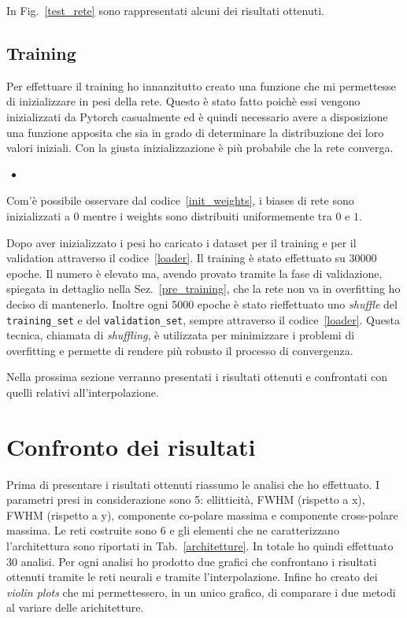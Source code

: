 \documentclass[12pt,a4paper,final]{book}
\newcommand{\insertcode}[2]{\begin{itemize}\item[]\end{itemize}} %
\begin{document}
In Fig.~\ref{test_rete} sono rappresentati alcuni dei risultati ottenuti.



\subsection{Training}\label{training}
Per effettuare il training ho innanzitutto creato una funzione che mi permettesse di inizializzare in pesi della rete. Questo è stato fatto poichè essi vengono inizializzati da Pytorch casualmente ed è quindi necessario avere a disposizione una funzione apposita che sia in grado di determinare la distribuzione dei loro valori iniziali. Con la giusta inizializzazione è più probabile che la rete converga.
\insertcode{../scripts/init_weights.py}{Inizializzazione di weights e biases}\label{init_weights}
Com'è possibile osservare dal codice~\ref{init_weights}, i biases di rete sono inizializzati a $0$ mentre i weights sono distribuiti uniformemente tra $0$ e $1$.


Dopo aver inizializzato i pesi ho caricato i dataset per il training e per il validation attraverso il codice~\ref{loader}.
Il training è stato effettuato su 30000 epoche. Il numero è elevato ma, avendo provato tramite la fase di validazione, spiegata in dettaglio nella Sez.~\ref{pre_training}, che la rete non va in overfitting ho deciso di mantenerlo. 
Inoltre ogni 5000 epoche è stato rieffettuato uno \textit{shuffle} del \texttt{training\_set} e del \texttt{validation\_set}, sempre attraverso il codice~\ref{loader}. Questa tecnica, chiamata di \textit{shuffling}, è utilizzata per minimizzare i problemi di overfitting e permette di rendere più robusto il processo di convergenza.


Nella prossima sezione verranno presentati i risultati ottenuti e confrontati con quelli relativi all'interpolazione.


\section{Confronto dei risultati}\label{risultati}
Prima di presentare i risultati ottenuti riassumo le analisi che ho effettuato. I parametri presi in considerazione sono 5: ellitticità, FWHM (rispetto a x), FWHM (rispetto a y), componente co-polare massima e componente cross-polare massima. Le reti costruite sono 6 e gli elementi che ne caratterizzano l'architettura sono riportati in Tab.~\ref{architetture}. In totale ho quindi effettuato 30 analisi.
Per ogni analisi ho prodotto due grafici che confrontano i risultati ottenuti tramite le  reti neurali e tramite l'interpolazione. Infine ho creato dei \textit{violin plots} che mi permettessero, in un unico grafico, di comparare i due metodi al variare delle arichitetture.
\end{document}
